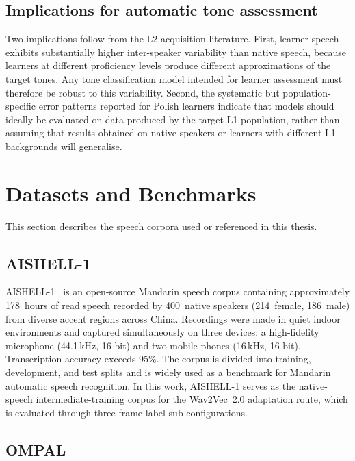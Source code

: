 \subsection{Implications for automatic tone assessment}

Two implications follow from the L2 acquisition literature. First, learner speech exhibits substantially higher inter-speaker variability than native speech, because learners at different proficiency levels produce different approximations of the target tones. Any tone classification model intended for learner assessment must therefore be robust to this variability. Second, the systematic but population-specific error patterns reported for Polish learners indicate that models should ideally be evaluated on data produced by the target L1 population, rather than assuming that results obtained on native speakers or learners with different L1 backgrounds will generalise.

\section{Datasets and Benchmarks}
\label{sec:sota:datasets}

This section describes the speech corpora used or referenced in this thesis.

\subsection{AISHELL-1}

AISHELL-1~\cite{bu2017aishell} is an open-source Mandarin speech corpus containing approximately 178~hours of read speech recorded by 400~native speakers (214~female, 186~male) from diverse accent regions across China. Recordings were made in quiet indoor environments and captured simultaneously on three devices: a high-fidelity microphone (44.1\,kHz, 16-bit) and two mobile phones (16\,kHz, 16-bit). Transcription accuracy exceeds 95\%. The corpus is divided into training, development, and test splits and is widely used as a benchmark for Mandarin automatic speech recognition. In this work, AISHELL-1 serves as the native-speech intermediate-training corpus for the Wav2Vec~2.0 adaptation route, which is evaluated through three frame-label sub-configurations.

\subsection{OMPAL}

